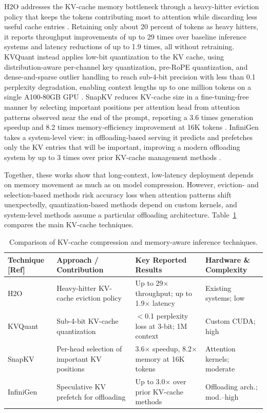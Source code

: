 H2O addresses the KV-cache memory bottleneck through a heavy-hitter eviction policy that keeps the tokens contributing most to attention while discarding less useful cache entries \cite{zhang2023h2o}. Retaining only about 20 percent of tokens as heavy hitters, it reports throughput improvements of up to 29 times over baseline inference systems and latency reductions of up to 1.9 times, all without retraining. KVQuant instead applies low-bit quantization to the KV cache, using distribution-aware per-channel key quantization, pre-RoPE quantization, and dense-and-sparse outlier handling to reach sub-4-bit precision with less than 0.1 perplexity degradation, enabling context lengths up to one million tokens on a single A100-80GB GPU \cite{hooper2024kvquant}. SnapKV reduces KV-cache size in a fine-tuning-free manner by selecting important positions per attention head from attention patterns observed near the end of the prompt, reporting a 3.6 times generation speedup and 8.2 times memory-efficiency improvement at 16K tokens \cite{li2024snapkv}. InfiniGen takes a system-level view: in offloading-based serving it predicts and prefetches only the KV entries that will be important, improving a modern offloading system by up to 3 times over prior KV-cache management methods \cite{lee2024infinigen}.

Together, these works show that long-context, low-latency deployment depends on memory movement as much as on model compression. However, eviction- and selection-based methods risk accuracy loss when attention patterns shift unexpectedly, quantization-based methods depend on custom kernels, and system-level methods assume a particular offloading architecture. Table~\ref{tab:lr-kv} compares the main KV-cache techniques.

\begin{table}[htbp]
\centering
\scriptsize
\caption{Comparison of KV-cache compression and memory-aware inference techniques.}
\label{tab:lr-kv}
\renewcommand{\arraystretch}{1.2}
\begin{tabular}{p{}p{}p{}p{}}
\hline
\textbf{Technique [Ref]} & \textbf{Approach / Contribution} & \textbf{Key Reported Results} & \textbf{Hardware \& Complexity} \\
\hline
H2O \cite{zhang2023h2o} & Heavy-hitter KV-cache eviction policy & Up to 29$\times$ throughput; up to 1.9$\times$ latency & Existing systems; low \\
KVQuant \cite{hooper2024kvquant} & Sub-4-bit KV-cache quantization & $<$0.1 perplexity loss at 3-bit; 1M context & Custom CUDA; high \\
SnapKV \cite{li2024snapkv} & Per-head selection of important KV positions & 3.6$\times$ speedup, 8.2$\times$ memory at 16K tokens & Attention kernels; moderate \\
InfiniGen \cite{lee2024infinigen} & Speculative KV prefetch for offloading & Up to 3.0$\times$ over prior KV-cache methods & Offloading arch.; mod.--high \\
\hline
\end{tabular}
\end{table}

